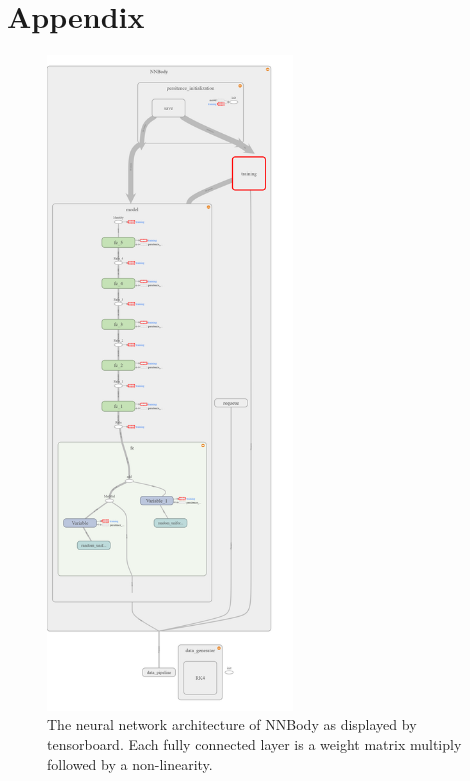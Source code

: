 \documentclass{article}
\numberwithin{theorem}{section}
\numberwithin{equation}{section}
\begin{document}
% 
% 
% 


\newpage
\section{Appendix}

\begin{figure}[H]
\begin{center}
	\caption{The neural network architecture of NNBody as displayed by tensorboard. Each fully connected layer is a weight matrix multiply followed by a non-linearity.}
	\includegraphics[width=0.58\textwidth]{lol.png}
\end{center}

\end{figure}
\end{document}
